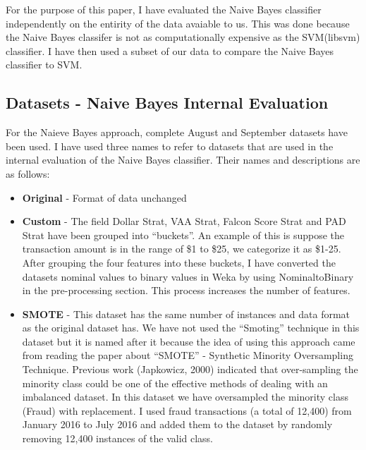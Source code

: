 \documentclass[conference]{IEEEtran}
\begin{document}
For the purpose of this paper, I have evaluated the Naive Bayes classifier independently on the entirity of the data avaiable to us. This was done because the Naive Bayes classifer is not as computationally expensive as the SVM(libsvm) classifier. I have then used a subset of our data to compare the Naive Bayes classifier to SVM. 

\subsection{Datasets - Naive Bayes Internal Evaluation}

For the Naieve Bayes approach, complete August and September datasets have been used. I have used three names to refer to datasets that are used in the internal evaluation of the Naive Bayes classifier. Their names and descriptions are as follows:\\

\begin{itemize}
\item\textbf{Original} - Format of data unchanged\\

\item\textbf{Custom} - The field Dollar Strat, VAA Strat, Falcon Score Strat and PAD Strat have been grouped into ``buckets''. An example of this is suppose the transaction amount is in the range of \$1 to \$25, we categorize it as \$1-25. After grouping the four features into these buckets, I have converted the datasets nominal values to binary values in Weka by using NominaltoBinary in the pre-processing section. This process increases the number of features.\\

\item\textbf{SMOTE} - This dataset has the same number of instances and data format as the original dataset has. We have not used the ``Smoting'' technique in this dataset but it is named after it because the idea of using this approach came from reading the paper about ``SMOTE'' - Synthetic Minority Oversampling Technique\cite{chawla2002smote}. Previous work (Japkowicz, 2000) indicated that over-sampling the minority class could be one of the effective methods of dealing with an imbalanced dataset\cite{japkowicz2000learning}. In this dataset we have oversampled the minority class (Fraud) with replacement. I used fraud transactions (a total of 12,400) from January 2016 to July 2016 and added them to the dataset by randomly removing 12,400 instances of the valid class.\\

\end{itemize}
\end{document}
